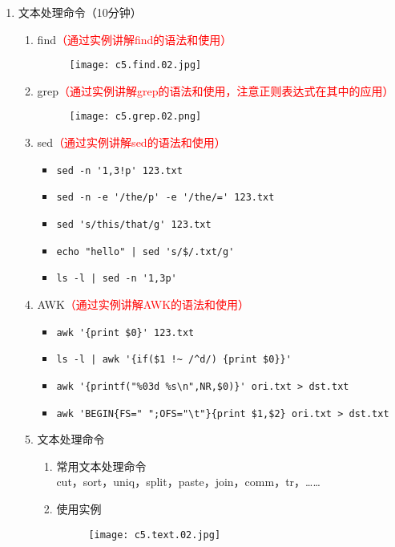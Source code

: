 \documentclass{TIJMUjiaoanSY}
\begin{document}
\begin{enumerate}
\otherTail
\newpage
\otherHeader

  \item 文本处理命令（10分钟）
    \begin{enumerate}
      \item find\textcolor{red}{（通过实例讲解find的语法和使用）}
	\begin{figure}[h]
	  \centering
	  \texttt{[image: c5.find.02.jpg]}
	\end{figure}
      \item grep\textcolor{red}{（通过实例讲解grep的语法和使用，注意正则表达式在其中的应用）}
	\begin{figure}[h]
	  \centering
	  \texttt{[image: c5.grep.02.png]}
	\end{figure}
      \item sed\textcolor{red}{（通过实例讲解sed的语法和使用）}
        \begin{itemize}
          \item \verb|sed -n '1,3!p' 123.txt|
          \item \verb|sed -n -e '/the/p' -e '/the/=' 123.txt|
          \item \verb|sed 's/this/that/g' 123.txt|
          \item \verb=echo "hello" | sed 's/$/.txt/g'=
          \item \verb=ls -l | sed -n '1,3p'=
        \end{itemize}
      \item AWK\textcolor{red}{（通过实例讲解AWK的语法和使用）}
        \begin{itemize}
          \item \verb|awk '{print $0}' 123.txt|
          \item \verb=ls -l | awk '{if($1 !~ /^d/) {print $0}}'=
          \item \verb|awk '{printf("%03d %s\n",NR,$0)}' ori.txt > dst.txt|
          \item \verb|awk 'BEGIN{FS=" ";OFS="\t"}{print $1,$2} ori.txt > dst.txt|
        \end{itemize}
      \item 文本处理命令
	\begin{enumerate}
	  \item 常用文本处理命令\\
	    cut，sort，uniq，split，paste，join，comm，tr，……
	  \item 使用实例
	    \begin{figure}[h]
	      \centering
	      \texttt{[image: c5.text.02.jpg]}
            \end{figure}
	\end{enumerate}
    \end{enumerate}


\end{enumerate}
\end{document}

